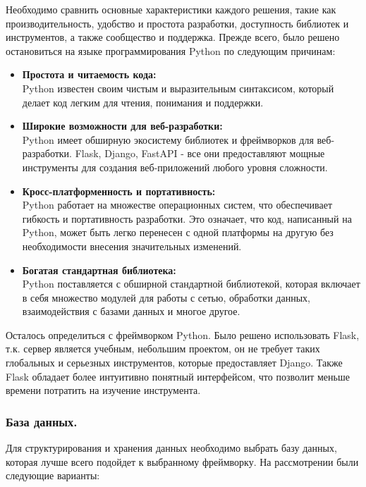 \documentclass[12pt, russian]{extarticle}
\begin{document}
\begin{spacing}{1.5}
    Необходимо сравнить основные характеристики каждого решения,
    такие как производительность, удобство и простота разработки, доступность библиотек и инструментов,
    а также сообщество и поддержка. Прежде всего, было решено остановиться на языке программирования
    Python по следующим причинам:

    \begin{itemize}
        \item \textbf{Простота и читаемость кода:} \\
            Python известен своим чистым и выразительным синтаксисом,
            который делает код легким для чтения, понимания и поддержки.
        \item \textbf{Широкие возможности для веб-разработки:} \\
            Python имеет обширную экосистему библиотек и фреймворков для веб-разработки.
            Flask, Django, FastAPI - все они предоставляют мощные инструменты для создания веб-приложений
            любого уровня сложности.
        \item \textbf{Кросс-платформенность и портативность:} \\
            Python работает на множестве операционных систем, что обеспечивает гибкость и
            портативность разработки. Это означает, что код, написанный на Python,
            может быть легко перенесен с одной платформы на другую без необходимости
            внесения значительных изменений.
        \item \textbf{Богатая стандартная библиотека:} \\
            Python поставляется с обширной стандартной библиотекой, которая включает
            в себя множество модулей для работы с сетью, обработки данных, взаимодействия
            с базами данных и многое другое.
    \end{itemize}

    Осталось определиться с фреймворком Python. Было решено использовать Flask, т.к.
    сервер является учебным, небольшим проектом, он не требует таких глобальных и серьезных
    инструментов, которые предоставляет Django. Также Flask обладает более интуитивно понятный интерфейсом,
    что позволит меньше времени потратить на изучение инструмента.

    \subsubsection{База данных.}

    Для структурирования и хранения данных необходимо выбрать базу данных, которая лучше всего
    подойдет к выбранному фреймворку. На рассмотрении были следующие варианты:


\end{spacing}
\end{document}
